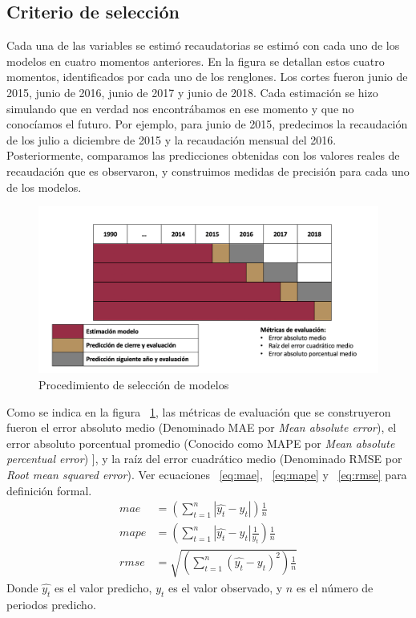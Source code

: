 \documentclass[a4paper, 11pt]{article}
\begin{document}
\subsection*{Criterio de selección}
Cada una de las variables se estimó recaudatorias se estimó con cada uno de los modelos en cuatro momentos anteriores. En la figura se detallan estos cuatro momentos, identificados por cada uno de los renglones. Los cortes fueron junio de 2015, junio de 2016, junio de 2017 y junio de 2018. Cada estimación se hizo simulando que en verdad nos encontrábamos en ese momento y que no conocíamos el futuro. Por ejemplo, para junio de 2015, predecimos la recaudación de los julio a diciembre de 2015 y la recaudación mensual del 2016. Posteriormente, comparamos las predicciones obtenidas con los valores reales de recaudación que es observaron, y construimos medidas de precisión para cada uno de los modelos. 
\begin{figure}[hbt!]
    \centering
     \caption{Procedimiento de selección de modelos}
     \label{fig:cross_validation}
     \includegraphics[scale = 0.3]{figures/cross_validation}
\end{figure}
Como se indica en la figura ~\ref{fig:cross_validation}, las métricas de evaluación que se construyeron fueron el error absoluto medio (Denominado MAE por \textit{Mean absolute error}), el error absoluto porcentual promedio (Conocido como MAPE por  \textit{Mean absolute percentual error}) ], y la raíz del error cuadrático medio (Denominado RMSE por \textit{Root mean squared error}). Ver ecuaciones ~\ref{eq:mae}, ~\ref{eq:mape} y ~\ref{eq:rmse} para definición formal.
\begin{align} 
mae &= (\sum_{t=1}^{n}{\left|\hat{y_{t}} - y_{t}\right|})\frac{1}{n} \label{eq:mae}\\
mape &= (\sum_{t=1}^{n}{\left|\hat{y_{t}} - y_{t}\right|\frac{1}{y_{t}}})\frac{1}{n} \label{eq:mape}\\
rmse &=\sqrt{(\sum_{t=1}^{n}{(\hat{y_{t}} - y_{t})^{2}})\frac{1}{n}} \label{eq:rmse}
\end{align}
Donde $\hat{y_{t}}$ es el valor predicho, $y_{t}$ es el valor observado, y $n$ es el número de periodos predicho.\\
\end{document}
